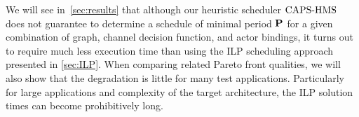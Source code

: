 \par
We will see in~\cref{sec:results} that although our heuristic scheduler $\textup{CAPS-HMS}$ does not guarantee to determine a schedule of minimal period $\mathbf{P}$ for a given combination of graph, channel decision function, and actor bindings, it turns out to require much less execution time than using the \ac{ILP} scheduling approach presented in \cref{sec:ILP}.
When comparing related Pareto front qualities, we will also show that the degradation is little for many test applications.
Particularly for large applications and complexity of the target architecture, the \ac{ILP} solution times can become prohibitively long.
